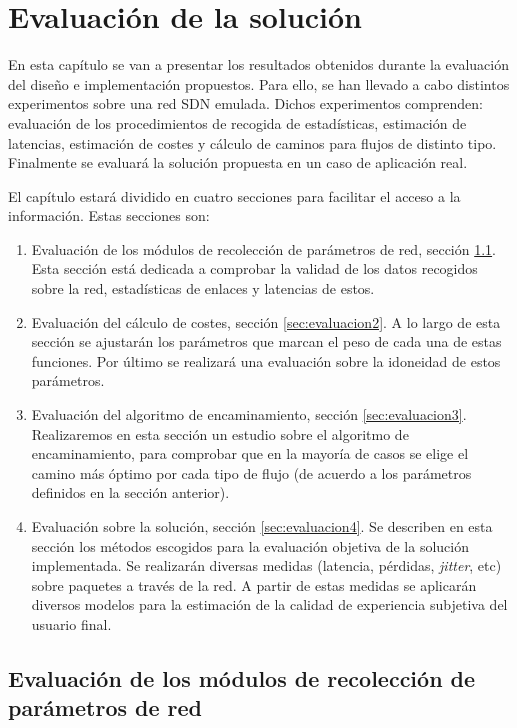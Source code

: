 \documentclass[a4paper,11pt]{book}
\begin{document}
\chapter{Evaluación de la solución}\label{cap:evaluation}

 En esta capítulo se van a presentar los resultados obtenidos durante la evaluación del diseño e implementación propuestos.  Para ello, se han llevado a cabo distintos experimentos sobre una red SDN emulada. Dichos experimentos comprenden: evaluación de los procedimientos de recogida de estadísticas, estimación de latencias, estimación de costes y cálculo de caminos para flujos de distinto tipo. Finalmente se evaluará la solución propuesta en un caso de aplicación real. 
 
El capítulo estará dividido en cuatro secciones para facilitar el acceso a la información. Estas secciones son:

\begin{enumerate}
\item Evaluación de los módulos de recolección  de parámetros de red, sección \ref{sec:evaluacion1}. Esta sección está dedicada a comprobar la validad de los datos recogidos sobre la red, estadísticas de enlaces y latencias de estos.
\item Evaluación del cálculo de costes, sección \ref{sec:evaluacion2}. A lo largo de esta sección se ajustarán los parámetros que marcan el peso de cada una de estas funciones. Por último se realizará una evaluación sobre la idoneidad de estos parámetros.
\item Evaluación del algoritmo de encaminamiento, sección \ref{sec:evaluacion3}. Realizaremos en esta sección un estudio sobre el algoritmo de encaminamiento, para comprobar que en la mayoría de casos se elige el camino más óptimo por cada tipo de flujo (de acuerdo a los parámetros definidos en la sección anterior).
\item Evaluación sobre la solución, sección \ref{sec:evaluacion4}. Se describen en esta sección los métodos escogidos para la evaluación objetiva de la solución implementada. Se realizarán diversas medidas (latencia, pérdidas, \emph{jitter}, etc) sobre paquetes a través de la red. A partir de estas medidas se aplicarán diversos modelos para la estimación de la calidad de experiencia subjetiva del usuario final.
\end{enumerate}


\section{Evaluación de los módulos de recolección de parámetros de red}\label{sec:evaluacion1}
\end{document}
